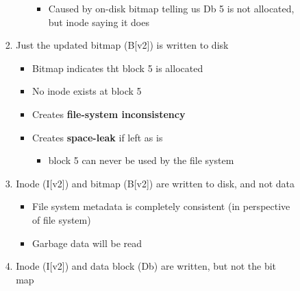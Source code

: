 \documentclass[12pt]{article}
\begin{document}
\begin{enumerate}[1.]
\begin{enumerate}[a)]
\begin{itemize}
\begin{enumerate}[1)]
\begin{itemize}
                    \begin{itemize}
                        \item Caused by on-disk bitmap telling us Db 5 is not allocated,
                        but inode saying it does
                    \end{itemize}
                \end{itemize}

                \bigskip

                \item Just the updated bitmap (B[v2]) is written to disk

                \bigskip

                \begin{itemize}
                    \item Bitmap indicates tht block 5 is allocated
                    \item No inode exists at block 5
                    \item Creates \textbf{file-system inconsistency}
                    \item Creates \textbf{space-leak} if left as is

                    \begin{itemize}
                        \item block 5 can never be used by the file system
                    \end{itemize}
                \end{itemize}

                \bigskip

                \item Inode (I[v2]) and bitmap (B[v2]) are written to disk, and not data

                \bigskip

                \begin{itemize}
                    \item File system metadata is completely consistent (in perspective of file system)
                    \item Garbage data will be read
                \end{itemize}

                \bigskip

                \item Inode (I[v2]) and data block (Db) are written, but not the bit map

                \bigskip


\end{enumerate}
\end{itemize}
\end{enumerate}
\end{enumerate}
\end{document}
